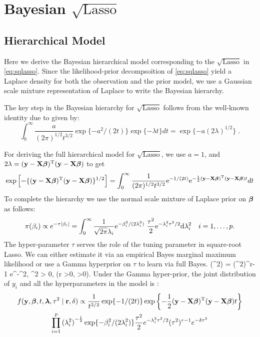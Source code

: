 \documentclass[11pt]{article}
\begin{document}
\section{Bayesian $\sqrt{\text{Lasso}}$ }

\subsection{Hierarchical Model}
Here we derive the Bayesian hierarchical model corresponding to the $\sqrt{\text{Lasso}}$ in \eqref{eq:sqlasso}. Since the likelihood-prior decompsoition of \eqref{eq:sqlasso} yield a Laplace density for both the observation and the prior model, we use a Gaussian scale mixture representation of Laplace to write the Bayesian hierarchy. 

The key step in the Bayesian hierarchy for $\sqrt{\text{Lasso}}$ follows from the well-known identity due to \citet{levy1940certains} given by:
\begin{equation}
  \int_{0}^{\infty} \frac{a}{(2 \pi)^{1/2} t^{3/2}} \exp\{-{a^2}/({2 t})\} \exp\{-\lambda t\} dt = \exp\{-a (2 \lambda)^{1/2} \} \;.\label{eq:levy}
\end{equation}

For deriving the full hierarchical model for $\sqrt{\text{Lasso}}$, we use $a = 1$, and $2\lambda = ({\bf y} - {\bf X} \boldsymbol{\beta})^{{\rm T}}({\bf y} - {\bf X} \boldsymbol{\beta})$ to get 
\begin{equation}
\exp \left[-\{({\bf y} - {\bf X} \boldsymbol{\beta})^{{\rm T}}({\bf y} - {\bf X} \boldsymbol{\beta}) \}^{1/2} \right] = \int_{0}^{\infty} \frac{1}{(2 \pi)^{1/2} t^{3/2}} {\rm e}^{-{1}/({2 t})} {\rm e}^{- \frac{1}{2} ({\bf y} - {\bf X} \boldsymbol{\beta})^{{\rm T}}({\bf y} - {\bf X} \boldsymbol{\beta}) t} dt
\end{equation}
To complete the hierarchy we use the normal scale mixture of Laplace prior on $\boldsymbol{\beta}$ \citep{andrews_scale_1974} as follows:
\[
\pi(\beta_i) \propto e^{-\tau \lvert\beta_i\rvert} = \int_{0}^{\infty} \frac{1}{\sqrt{2\pi} \lambda_i} {\rm e}^{-\beta_i^2/(2\lambda_i^2)} \; \frac{\tau^2}{2} {\rm e}^{-\lambda_i^2\tau^2/2} {\rm d} \lambda_i^2 \quad i = 1, \ldots, p.
\]
The hyper-parameter $\tau$ serves the role of the tuning parameter in square-root Lasso. We can either estimate it via an empirical Bayes marginal maximum likelihood or use a Gamma hyperprior on $\tau$ to learn via full Bayes. 
\beq
\pi(\tau^2) =  (\tau^2)^{r-1} e^{-\delta \tau^2}, \; \tau^2 > 0, \; (r >0, \delta >0).
\eeq
Under the Gamma hyper-prior, the joint distribution of $y_i$ and all the hyperparameters in the model is :
\begin{multline}
f({\bf y}, \boldsymbol{\beta}, t, \boldsymbol{\lambda}, \tau^2 \mid {\bf r}, \delta) \propto 
\frac{1}{t^{3/2}} \exp\{-{1}/({2 t}) \} \exp \left\{- \frac{1}{2} ({\bf y} - {\bf X} \boldsymbol{\beta})^{{\rm T}}({\bf y} - {\bf X} \boldsymbol{\beta}) t \right\} \\
\prod_{i=1}^{p} {(\lambda_i^2)}^{-\frac{1}{2}} \exp\{-\beta_i^2/(2\lambda_i^2)\} \frac{\tau^2}{2} e^{-\lambda_i^2\tau^2/2} (\tau^2)^{r-1} e^{-\delta \tau^2} \label{eq:joint}
\end{multline}
\end{document}
